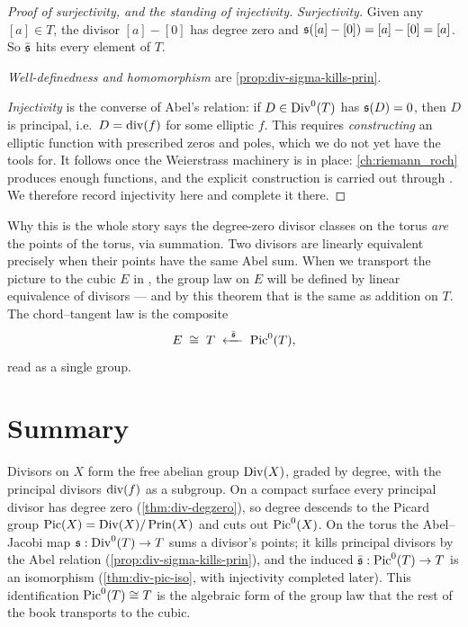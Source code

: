 \begin{proof}[Proof of surjectivity, and the standing of injectivity]
\emph{Surjectivity.} Given any \([a] \in T\), the divisor \([a] - [0]\) has degree
zero and \(\mathfrak{s}([a]-[0]) = [a] - [0] = [a]\). So \(\bar{\mathfrak{s}}\) hits every
element of \(T\).

\emph{Well-definedness and homomorphism} are \cref{prop:div-sigma-kills-prin}.

\emph{Injectivity} is the converse of Abel's relation: if \(D \in \operatorname{Div}^0(T)\)
has \(\mathfrak{s}(D) = 0\), then \(D\) is principal, i.e.\ \(D = \operatorname{div}(f)\) for some
elliptic \(f\). This requires \emph{constructing} an elliptic function with
prescribed zeros and poles, which we do not yet have the tools for. It follows
once the Weierstrass machinery is in place: \cref{ch:riemann_roch} produces
enough functions, and the explicit construction is carried out through
. We therefore record injectivity
here and complete it there.
\end{proof}

\begin{keyidea}{Why this is the whole story}
 says the degree-zero divisor classes on the torus
\emph{are} the points of the torus, via summation. Two divisors are linearly
equivalent precisely when their points have the same Abel sum. When we transport
the picture to the cubic \(E\) in ,
the group law on \(E\) will be defined by linear equivalence of divisors --- and
by this theorem that is the same as addition on \(T\). The chord--tangent law is
the composite
\[
  E \;\cong\; T \;\xleftarrow{\ \bar{\mathfrak{s}}\ }\; \operatorname{Pic}^0(T) ,
\]
read as a single group.
\end{keyidea}

\section{Summary}
\label{sec:div-summary}

Divisors on \(X\) form the free abelian group \(\operatorname{Div}(X)\), graded by degree, with
the principal divisors \(\operatorname{div}(f)\) as a subgroup. On a compact surface every
principal divisor has degree zero (\cref{thm:div-degzero}), so degree descends to
the Picard group \(\operatorname{Pic}(X) = \operatorname{Div}(X)/\operatorname{Prin}(X)\) and cuts out \(\operatorname{Pic}^0(X)\). On
the torus the Abel--Jacobi map \(\mathfrak{s} : \operatorname{Div}^0(T) \to T\) sums a divisor's
points; it kills principal divisors by the Abel relation
(\cref{prop:div-sigma-kills-prin}), and the induced
\(\bar{\mathfrak{s}} : \operatorname{Pic}^0(T) \to T\) is an isomorphism (\cref{thm:div-pic-iso}, with
injectivity completed later). This identification \(\operatorname{Pic}^0(T) \cong T\) is the
algebraic form of the group law that the rest of the book transports to the
cubic.


